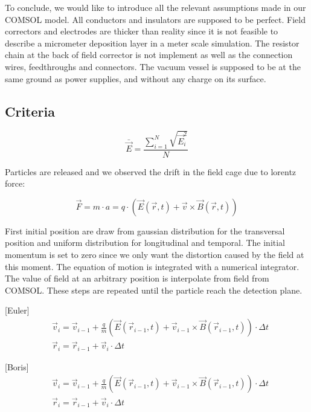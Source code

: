 \begin{refsection}
	To conclude, we would like to introduce all the relevant assumptions made in our COMSOL model. All conductors and insulators are supposed to be perfect. Field correctors and electrodes are thicker than reality since it is not feasible to describe a micrometer deposition layer in a meter scale simulation. The resistor chain at the back of field corrector is not implement as well as the connection wires, feedthroughs and connectors. The vacuum vessel is supposed to be at the same ground as power supplies, and without any charge on its surface.

	\subsection{Criteria}

	\begin{equation}
		\bar{\vec{E}} = \frac{\sum_{i=1}^{N}\sqrt{\vec{E}_{i}^{2}}}{N}
	\end{equation}

	Particles are released and we observed the drift in the field cage due to lorentz force:

	\begin{equation}
		\vec{F} = m \cdot a = q \cdot (\vec{E}(\vec{r},t) + \vec{v} \times \vec{B}(\vec{r},t))
	\end{equation}

	First initial position are draw from gaussian distribution for the transversal position and uniform distribution for longitudinal and temporal. The initial momentum is set to zero since we only want the distortion caused by the field at this moment. The equation of motion is integrated with a numerical integrator. The value of field at an arbitrary position is interpolate from field from COMSOL. These steps are repeated until the particle reach the detection plane.

	

	[Euler]
	\begin{align}
		 & \vec{v}_{i} = \vec{v}_{i-1} + \frac{q}{m}(\vec{E}(\vec{r}_{i-1},t) + \vec{v}_{i-1} \times \vec{B}(\vec{r}_{i-1},t)) \cdot \Delta t \\
		 & \vec{r}_{i} = \vec{r}_{i-1} + \vec{v}_{i} \cdot \Delta t
	\end{align}

	[Boris]
	\begin{align}
		 & \vec{v}_{i} = \vec{v}_{i-1} + \frac{q}{m}(\vec{E}(\vec{r}_{i-1},t) + \vec{v}_{i-1} \times \vec{B}(\vec{r}_{i-1},t)) \cdot \Delta t \\
		 & \vec{r}_{i} = \vec{r}_{i-1} + \vec{v}_{i} \cdot \Delta t
	\end{align}


\end{refsection}
